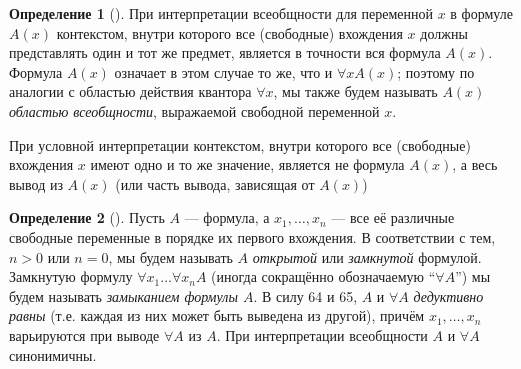 \documentclass[a4paper, 12pt]{article}  %
\theoremstyle{definition}
\newtheorem*{definition}{Определение}
\begin{document}
	\begin{definition}[]	
		При интерпретации всеобщности для переменной $x$ в формуле $A(x)$ контекстом, внутри которого
		все (свободные) вхождения $x$ должны представлять один и тот же предмет, является в точности
		вся формула $A(x)$. Формула $A(x)$ означает в этом случае то же, что и $\forall x A(x)$;
		поэтому по аналогии с областью действия квантора $\forall x$, мы также будем называть $A(x)$
		\textit{областью всеобщности}, выражаемой свободной переменной $x$.
		
		При условной интерпретации контекстом, внутри которого все (свободные) вхождения $x$ имеют
		одно и то же значение, является не формула $A(x)$, а весь вывод из $A(x)$ (или часть вывода,
		зависящая от $A(x)$)	
	\end{definition}

	\begin{definition}[]
		Пусть $A$ --- формула, а $x_1, \dots, x_n$ --- все её различные свободные переменные в
		порядке их первого вхождения. В соответствии с тем, $n > 0$ или $n = 0$, мы будем называть
		$A$ \textit{открытой} или \textit{замкнутой} формулой. Замкнутую формулу $\forall x_1 \dots
		\forall x_n A$ (иногда сокращённо обозначаемую ``$\forall A$'') мы будем называть
		\textit{замыканием формулы $A$}. В силу 64 и 65, $A$ и $\forall A$ \textit{дедуктивно равны}
		(т.е. каждая из них может быть выведена из другой), причём $x_1, \dots, x_n$ варьируются при
		выводе $\forall A$ из $A$. При интерпретации всеобщности $A$ и $\forall A$ синонимичны. 	
	\end{definition}
\end{document}

